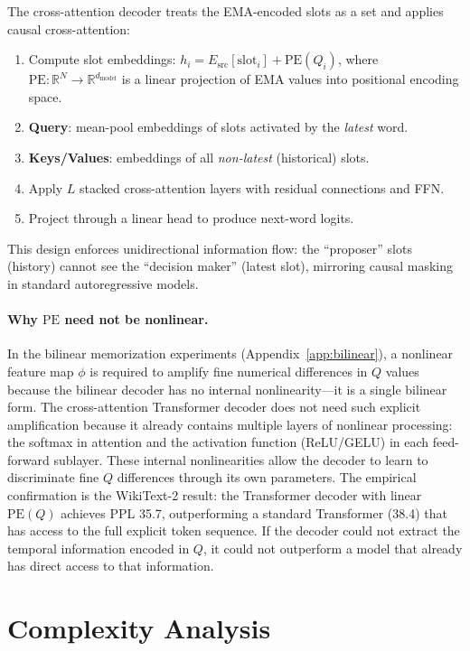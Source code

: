\documentclass[11pt]{article}
\begin{document}
The cross-attention decoder treats the EMA-encoded slots as a set and applies causal cross-attention:
\begin{enumerate}[leftmargin=1.5em]
    \item Compute slot embeddings: $h_i = E_{\text{src}}[\text{slot}_i] + \text{PE}(Q_i)$, where $\text{PE}: \mathbb{R}^N \to \mathbb{R}^{d_{\text{model}}}$ is a linear projection of EMA values into positional encoding space.
    \item \textbf{Query}: mean-pool embeddings of slots activated by the \emph{latest} word.
    \item \textbf{Keys/Values}: embeddings of all \emph{non-latest} (historical) slots.
    \item Apply $L$ stacked cross-attention layers with residual connections and FFN.
    \item Project through a linear head to produce next-word logits.
\end{enumerate}

This design enforces unidirectional information flow: the ``proposer'' slots (history) cannot see the ``decision maker'' (latest slot), mirroring causal masking in standard autoregressive models.

\paragraph{Why $\text{PE}$ need not be nonlinear.}
In the bilinear memorization experiments (Appendix~\ref{app:bilinear}), a nonlinear feature map $\phi$ is required to amplify fine numerical differences in $Q$ values because the bilinear decoder has no internal nonlinearity---it is a single bilinear form. The cross-attention Transformer decoder does not need such explicit amplification because it already contains multiple layers of nonlinear processing: the softmax in attention and the activation function (ReLU/GELU) in each feed-forward sublayer. These internal nonlinearities allow the decoder to learn to discriminate fine $Q$ differences through its own parameters. The empirical confirmation is the WikiText-2 result: the Transformer decoder with linear $\text{PE}(Q)$ achieves PPL 35.7, outperforming a standard Transformer (38.4) that has access to the full explicit token sequence. If the decoder could not extract the temporal information encoded in $Q$, it could not outperform a model that already has direct access to that information.

\section{Complexity Analysis}
\label{sec:complexity}
\end{document}
